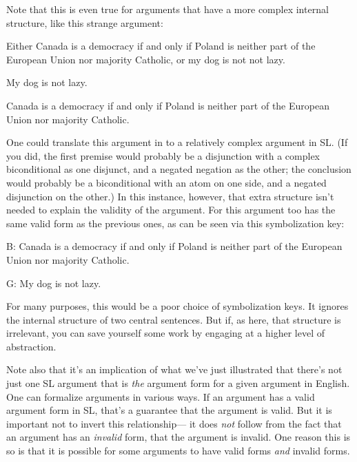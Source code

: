 Note that this is even true for arguments that have a more complex internal structure, like this strange argument:

\begin{earg}
\item Either Canada is a democracy if and only if Poland is neither part of the European Union nor majority Catholic, or my dog is not not lazy.
\item My dog is not lazy.
\item[\therefore] Canada is a democracy if and only if Poland is neither part of the European Union nor majority Catholic.
\end{earg}

One could translate this argument in to a relatively complex argument in SL. (If you did, the first premise would probably be a disjunction with a complex biconditional as one disjunct, and a negated negation as the other; the conclusion would probably be a biconditional with an atom on one side, and a negated disjunction on the other.) In this instance, however, that extra structure isn't needed to explain the validity of the argument. For this argument too has the same valid form as the previous ones, as can be seen via this symbolization key:

\begin{ekey}
\item[B:] Canada is a democracy if and only if Poland is neither part of the European Union nor majority Catholic.
\item[G:] My dog is not lazy.
\end{ekey}

For many purposes, this would be a poor choice of symbolization keys. It ignores the internal structure of two central sentences. But if, as here, that structure is irrelevant, you can save yourself some work by engaging at a higher level of abstraction.

Note also that it's an implication of what we've just illustrated that there's not just one SL argument that is \emph{the} argument form for a given argument in English. One can formalize arguments in various ways. If an argument has a valid argument form in SL, that's a guarantee that the argument is valid. But it is important not to invert this relationship--- it does \emph{not} follow from the fact that an argument has an \emph{invalid} form, that the argument is invalid. One reason this is so is that it is possible for some arguments to have valid forms \emph{and} invalid forms.

